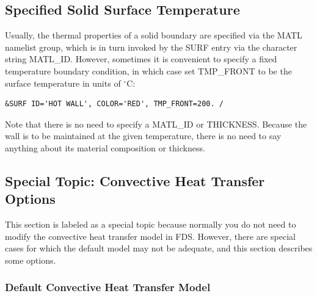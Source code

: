 \documentclass[11pt]{book}
\begin{document}
\subsection{Specified Solid Surface Temperature}
\label{info:specified_temperature}

Usually, the thermal properties of a solid boundary are specified via the
{\ct MATL} namelist group, which is in turn invoked by the {\ct SURF} entry via
the character string {\ct MATL\_ID}. However, sometimes it is convenient to
specify a fixed temperature boundary condition, in which case set
{\ct TMP\_FRONT} to be the surface temperature in units of $^\circ$C:

\begin{lstlisting}
&SURF ID='HOT WALL', COLOR='RED', TMP_FRONT=200. /
\end{lstlisting}

\noindent
Note that there is no need to specify a {\ct MATL\_ID} or {\ct THICKNESS}. Because the wall is to be maintained at the given temperature,
there is no need to say anything about its material composition or thickness.



\subsection{Special Topic: Convective Heat Transfer Options}
\label{info:convection}

This section is labeled as a special topic because normally you do not need to modify the convective heat transfer model in FDS. However, there are special cases for which the default model may not be adequate, and this section describes some options.

\subsubsection{Default Convective Heat Transfer Model}
\end{document}
